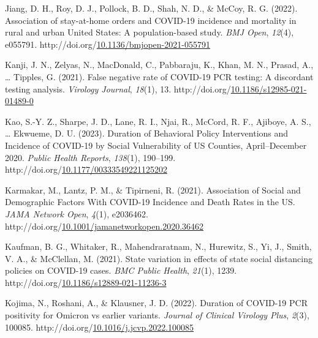\documentclass[12pt,twoside]{smiththesis}
\newlength{\cslhangindent}
\newenvironment{CSLReferences}[2] %
 {%
\setlength{\parindent}{0pt}
\ifodd #1 \everypar{\setlength{\hangindent}{\cslhangindent}}\ignorespaces\fi
\ifnum #2 > 0
\setlength{\parskip}{#2\baselineskip}
  \fi
}%
{}
\begin{document}
\begin{CSLReferences}{1}{0}
\leavevmode{}%
Jiang, D. H., Roy, D. J., Pollock, B. D., Shah, N. D., \& McCoy, R. G. (2022). Association of stay-at-home orders and {COVID-19} incidence and mortality in rural and urban {United States}: A population-based study. \emph{BMJ Open}, \emph{12}(4), e055791. http://doi.org/\href{https://doi.org/10.1136/bmjopen-2021-055791}{10.1136/bmjopen-2021-055791}

\leavevmode{}%
Kanji, J. N., Zelyas, N., MacDonald, C., Pabbaraju, K., Khan, M. N., Prasad, A., \ldots{} Tipples, G. (2021). False negative rate of {COVID-19 PCR} testing: A discordant testing analysis. \emph{Virology Journal}, \emph{18}(1), 13. http://doi.org/\href{https://doi.org/10.1186/s12985-021-01489-0}{10.1186/s12985-021-01489-0}

\leavevmode{}%
Kao, S.-Y. Z., Sharpe, J. D., Lane, R. I., Njai, R., McCord, R. F., Ajiboye, A. S., \ldots{} Ekwueme, D. U. (2023). Duration of {Behavioral Policy Interventions} and {Incidence} of {COVID-19} by {Social Vulnerability} of {US Counties}, {April}--{December} 2020. \emph{Public Health Reports}, \emph{138}(1), 190--199. http://doi.org/\href{https://doi.org/10.1177/00333549221125202}{10.1177/00333549221125202}

\leavevmode{}%
Karmakar, M., Lantz, P. M., \& Tipirneni, R. (2021). Association of {Social} and {Demographic Factors With COVID-19 Incidence} and {Death Rates} in the {US}. \emph{JAMA Network Open}, \emph{4}(1), e2036462. http://doi.org/\href{https://doi.org/10.1001/jamanetworkopen.2020.36462}{10.1001/jamanetworkopen.2020.36462}

\leavevmode{}%
Kaufman, B. G., Whitaker, R., Mahendraratnam, N., Hurewitz, S., Yi, J., Smith, V. A., \& McClellan, M. (2021). State variation in effects of state social distancing policies on {COVID-19} cases. \emph{BMC Public Health}, \emph{21}(1), 1239. http://doi.org/\href{https://doi.org/10.1186/s12889-021-11236-3}{10.1186/s12889-021-11236-3}

\leavevmode{}%
Kojima, N., Roshani, A., \& Klausner, J. D. (2022). Duration of {COVID-19 PCR} positivity for {Omicron} vs earlier variants. \emph{Journal of Clinical Virology Plus}, \emph{2}(3), 100085. http://doi.org/\href{https://doi.org/10.1016/j.jcvp.2022.100085}{10.1016/j.jcvp.2022.100085}


\end{CSLReferences}
\end{document}
